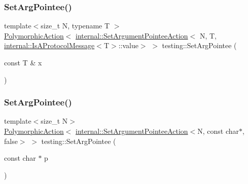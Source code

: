 \mbox{\label{namespacetesting_a5740a5033b88c37666fcd09a269d123f}} 
\subsubsection{\texorpdfstring{SetArgPointee()}{SetArgPointee()}\hspace{0.1cm}{\footnotesize\ttfamily [1/3]}}
{\footnotesize\ttfamily template$<$size\+\_\+t N, typename T $>$ \\
\mbox{\hyperlink{classtesting_1_1PolymorphicAction}{Polymorphic\+Action}}$<$ \mbox{\hyperlink{classtesting_1_1internal_1_1SetArgumentPointeeAction}{internal\+::\+Set\+Argument\+Pointee\+Action}}$<$ N, T, \mbox{\hyperlink{structtesting_1_1internal_1_1IsAProtocolMessage}{internal\+::\+Is\+A\+Protocol\+Message}}$<$T$>$\+::value$>$ $>$ testing\+::\+Set\+Arg\+Pointee (\begin{DoxyParamCaption}\item[{const T \&}]{x }\end{DoxyParamCaption})}

\mbox{\label{namespacetesting_a4a190fd2d02fb7cd79c5b3df3f80b647}} 
\subsubsection{\texorpdfstring{SetArgPointee()}{SetArgPointee()}\hspace{0.1cm}{\footnotesize\ttfamily [2/3]}}
{\footnotesize\ttfamily template$<$size\+\_\+t N$>$ \\
\mbox{\hyperlink{classtesting_1_1PolymorphicAction}{Polymorphic\+Action}}$<$ \mbox{\hyperlink{classtesting_1_1internal_1_1SetArgumentPointeeAction}{internal\+::\+Set\+Argument\+Pointee\+Action}}$<$N, const char$\ast$, false$>$ $>$ testing\+::\+Set\+Arg\+Pointee (\begin{DoxyParamCaption}\item[{const char $\ast$}]{p }\end{DoxyParamCaption})}

\mbox{\label{namespacetesting_ac128085b4a8d64563fd5ccef324ea177}} 
